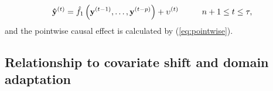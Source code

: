 \documentclass[hidelinks,12pt]{article}
\begin{document}
\begin{equation}\label{eq:ar-post}
\mathbf{\hat{y}}^{(t)} =  \hat{f_1} \left(\mathbf{y}^{(t-1)}, \ldots, \mathbf{y}^{(t-p)}\right) + \upsilon^{(t)} \hspace{10mm} n+1 \leq t \leq \tau, 
\end{equation}
\noindent 
and the pointwise causal effect is calculated by (\ref{eq:pointwise}).

\subsection{Relationship to covariate shift and domain adaptation}




	
\end{document}
